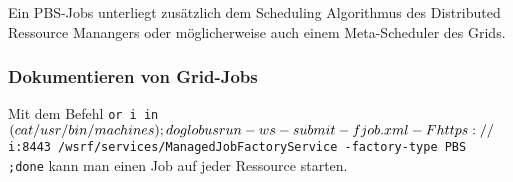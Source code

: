		Ein PBS-Jobs unterliegt zusätzlich dem Scheduling Algorithmus des
		Distributed Ressource Manangers %
		oder möglicherweise auch einem Meta-Scheduler des Grids.
	
	\subsubsection{Dokumentieren von Grid-Jobs}
		Mit dem Befehl
		\texttt{or i in $(cat /usr/bin/machines); do \\
		globusrun-ws -submit -f job.xml -F https://${i}:8443 /wsrf/services/ManagedJobFactoryService -factory-type PBS \\
		;done}
		kann man einen Job auf jeder Ressource starten.

	
		


